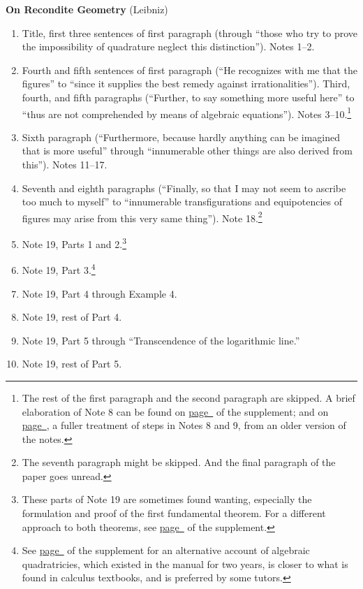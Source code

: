 \documentclass[10pt]{article}
\begin{document}
\textbf{On Recondite Geometry} (Leibniz)
\begin{enumerate}[resume*] \item Title, first three
		sentences of first paragraph (through
		``those who try to prove the impossibility
		of quadrature neglect this distinction'').
		Notes 1--2.  
	\item Fourth and fifth sentences of first paragraph
		(``He recognizes with me that the figures''
		to ``since it supplies the best remedy
		against irrationalities''). Third, fourth,
	       and fifth paragraphs (``Further, to say
	       something more useful here'' to ``thus are
	       not comprehended by means of algebraic
	       equations''). Notes 3--10.\footnote{The rest
		       of the first paragraph and the second
		       paragraph are skipped. A brief
		       elaboration of Note 8 can be found on
		       \hyperref[supple.21]{page~\pageref{supple.21}}
		       of the supplement; and 
	       on
	       \hyperref[supple.22]{page~\pageref{supple.22}},
a fuller treatment of steps in Notes 8 and 9,
	       from an older version of the notes.}
       \item Sixth paragraph (``Furthermore, because hardly
	       anything can be imagined that is more
	       useful'' through ``innumerable other things
	       are also derived from this''). Notes 11--17.	       
       \item Seventh and eighth paragraphs (``Finally, so
	       that I may not seem to ascribe too much to
	       myself'' to ``innumerable transfigurations
	       and equipotencies of figures may arise from
	       this very same thing''). Note
	       18.\footnote{The seventh paragraph might be
		       skipped. And the final paragraph of
		       the paper goes
		       unread.}
       \item Note 19, Parts 1 and 2.\footnote{These parts
		       of Note 19 are sometimes found
		       wanting, especially the
		       formulation and proof of the first
		       fundamental theorem. For a different
		       approach to both theorems, see 
		       \hyperref[supple.28]{page~\pageref{supple.28}}
		       of the supplement.} 
       \item Note 19, Part 3.\footnote{See
		       \hyperref[supple.30]{page~\pageref{supple.30}}
		       of the supplement for an alternative
		       account of algebraic quadratricies,
		       which existed in the manual for two
		       years, is 
		       closer to what is found in calculus
		       textbooks, and is preferred by some
		       tutors.}  
       \item Note 19, Part 4 through Example 4.
       \item Note 19, rest of Part 4.
       \item Note 19, Part 5 through ``Transcendence of the
	       logarithmic line.''
       \item Note 19, rest of Part 5.
\end{enumerate}
\end{document}
